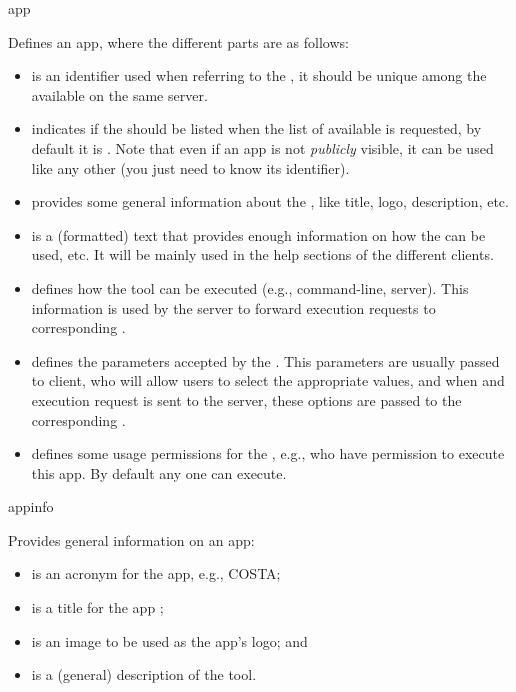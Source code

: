 \bigskip
\xmlstruct
{app}
{
%
  Defines an app, where the different parts are as follows:
%
  \begin{itemize}

  \item {} is an identifier used when referring to the
    \app, it should be unique among the \apps available on the same
    server.

  \item {} indicates if the \app should be listed
    when the list of available \apps is requested, by default it is
    . Note that even if an app is not
    \emph{publicly} visible, it can be used like any other \app (you
    just need to know its identifier).

  \item {} provides some general information about
    the \app, like title, logo, description, etc.

  \item {} is a (formatted) text that provides
    enough information on how the \app can be used, etc. It will be
    mainly used in the help sections of the different clients.

  \item {} defines how the tool can be executed
    (e.g., command-line, server). This information is used by the
    \apps server to forward execution requests to corresponding \apps.

  \item {} defines the parameters accepted by
    the \app. This parameters are usually passed to client, who will
    allow users to select the appropriate values, and when and
    execution request is sent to the \apps server, these options are
    passed to the corresponding \app.

  \item {} defines some usage permissions for
    the \app, e.g., who have permission to execute this app. By
    default any one can execute.

  \end{itemize}
%
}
{}


\bigskip
\xmlstruct
{appinfo}
{
%
  Provides general information on an app:

  \begin{itemize}
  \item {} is an acronym for the app,
    e.g., COSTA;
  \item {} is a title for the app ;
  \item {} is an image to be used as the
    app's logo; and
  \item {} is a (general) description of the tool.
  \end{itemize}
%
}
{}


